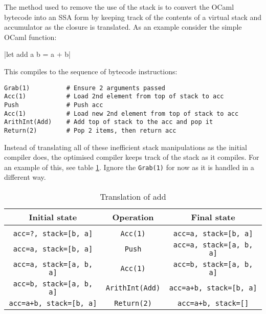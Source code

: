 The method used to remove the use of the stack is to convert the OCaml bytecode into an SSA form
by keeping track of the contents of a virtual stack and accumulator as the closure is translated.
As an example consider the simple OCaml function:

|let add a b = a + b|

This compiles to the sequence of bytecode instructions:

\begin{verbatim}
Grab(1)          # Ensure 2 arguments passed
Acc(1)           # Load 2nd element from top of stack to acc
Push             # Push acc
Acc(1)           # Load new 2nd element from top of stack to acc
ArithInt(Add)    # Add top of stack to the acc and pop it
Return(2)        # Pop 2 items, then return acc
\end{verbatim}

Instead of translating all of these inefficient stack manipulations as the initial compiler does,
the optimised compiler keeps track of the stack as it compiles. For an example of this, see table
\ref{table:stacktrans}. Ignore the \texttt{Grab(1)} for
now as it is handled in a different way.

\begin{table}[h]
      \centering
      \begin{tabular}{ccc}\toprule
            Initial state                   & Operation              & Final state
            \\
            \midrule
            \\
            \texttt{acc=?, stack=[b, a]}    & \texttt{Acc(1)}        & \texttt{acc=a, stack=[b, a]}
            \\
            \texttt{acc=a, stack=[b, a]}    & \texttt{Push}          & \texttt{acc=a, stack=[a, b,
                              a]}
            \\
            \texttt{acc=a, stack=[a, b, a]} & \texttt{Acc(1)}        & \texttt{acc=b, stack=[a, b,
                              a]}
            \\
            \texttt{acc=b, stack=[a, b, a]} & \texttt{ArithInt(Add)} & \texttt{acc=a+b, stack=[b,
                              a]}
            \\
            \texttt{acc=a+b, stack=[b, a]}  & \texttt{Return(2)}     & \texttt{acc=a+b, stack=[]}
            \\
            \bottomrule
      \end{tabular}

      \caption{Translation of add}
      \label{table:stacktrans}
\end{table}

